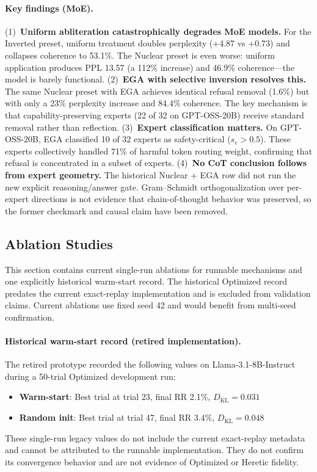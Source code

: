 \documentclass[11pt]{article}
\begin{document}
\paragraph{Key findings (MoE).}
(1)~\textbf{Uniform abliteration catastrophically degrades MoE models.} For the Inverted preset, uniform treatment doubles perplexity (+4.87 vs +0.73) and collapses coherence to 53.1\%. The Nuclear preset is even worse: uniform application produces PPL 13.57 (a 112\% increase) and 46.9\% coherence---the model is barely functional.
(2)~\textbf{EGA with selective inversion resolves this.} The same Nuclear preset with EGA achieves identical refusal removal (1.6\%) but with only a 23\% perplexity increase and 84.4\% coherence. The key mechanism is that capability-preserving experts (22 of 32 on GPT-OSS-20B) receive standard removal rather than reflection.
(3)~\textbf{Expert classification matters.} On GPT-OSS-20B, EGA classified 10 of 32 experts as safety-critical ($s_e > 0.5$). These experts collectively handled 71\% of harmful token routing weight, confirming that refusal is concentrated in a subset of experts.
(4)~\textbf{No CoT conclusion follows from expert geometry.} The historical Nuclear + EGA row did not run the new explicit reasoning/answer gate. Gram--Schmidt orthogonalization over per-expert directions is not evidence that chain-of-thought behavior was preserved, so the former checkmark and causal claim have been removed.

\subsection{Ablation Studies}
\label{sec:exp_ablation}

This section contains current single-run ablations for runnable mechanisms and one explicitly historical warm-start record. The historical Optimized record predates the current exact-replay implementation and is excluded from validation claims. Current ablations use fixed seed 42 and would benefit from multi-seed confirmation.

\paragraph{Historical warm-start record (retired implementation).}
The retired prototype recorded the following values on Llama-3.1-8B-Instruct during a 50-trial Optimized development run:
\begin{itemize}[leftmargin=*]
    \item \textbf{Warm-start}: Best trial at trial 23, final RR 2.1\%, $D_{\text{KL}} = 0.031$
    \item \textbf{Random init}: Best trial at trial 47, final RR 3.4\%, $D_{\text{KL}} = 0.048$
\end{itemize}
These single-run legacy values do not include the current exact-replay metadata and cannot be attributed to the runnable implementation. They do not confirm its convergence behavior and are not evidence of Optimized or Heretic fidelity.
\end{document}
